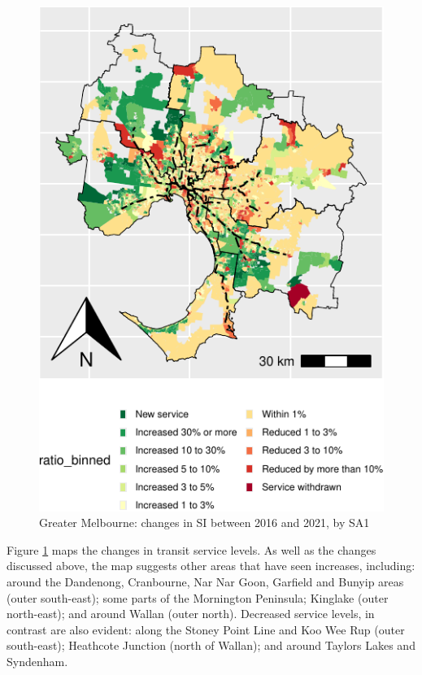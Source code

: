 \documentclass[preprint, 3p,
authoryear]{elsarticle} %
\begin{document}
\begin{figure}
\includegraphics[width=0.9\linewidth]{Leveraging_GTFS_to_assess_transit_supply_Transport_Geography_files/figure-latex/Greater_Melbourne_2016_2021_ratio_map-1} \caption{Greater Melbourne: changes in SI between 2016 and 2021, by SA1}\label{fig:Greater_Melbourne_2016_2021_ratio_map}
\end{figure}

Figure \ref{fig:Greater_Melbourne_2016_2021_ratio_map} maps the changes
in transit service levels. As well as the changes discussed above, the
map suggests other areas that have seen increases, including: around the
Dandenong, Cranbourne, Nar Nar Goon, Garfield and Bunyip areas (outer
south-east); some parts of the Mornington Peninsula; Kinglake (outer
north-east); and around Wallan (outer north). Decreased service levels,
in contrast are also evident: along the Stoney Point Line and Koo Wee
Rup (outer south-east); Heathcote Junction (north of Wallan); and around
Taylors Lakes and Syndenham.
\end{document}
